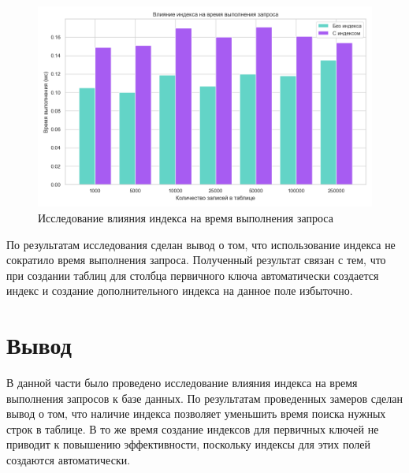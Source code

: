 \begin{figure}[H]
	\centering
	\includegraphics[width=1\linewidth]{img/graph_id.png}
	\caption{Исследование влияния индекса на время выполнения запроса}
	\label{id_graph}
\end{figure}

По результатам исследования сделан вывод о том, что использование индекса не сократило время выполнения запроса. Полученный результат связан с тем, что при создании таблиц для столбца первичного ключа автоматически создается индекс и создание дополнительного индекса на данное поле избыточно. 




\section*{Вывод}
В данной части было проведено исследование влияния индекса на время выполнения запросов к базе данных. По результатам проведенных замеров сделан вывод о том, что наличие индекса позволяет уменьшить время поиска нужных строк в таблице. В то же время создание индексов для первичных ключей не приводит к повышению эффективности, поскольку индексы для этих полей создаются автоматически.